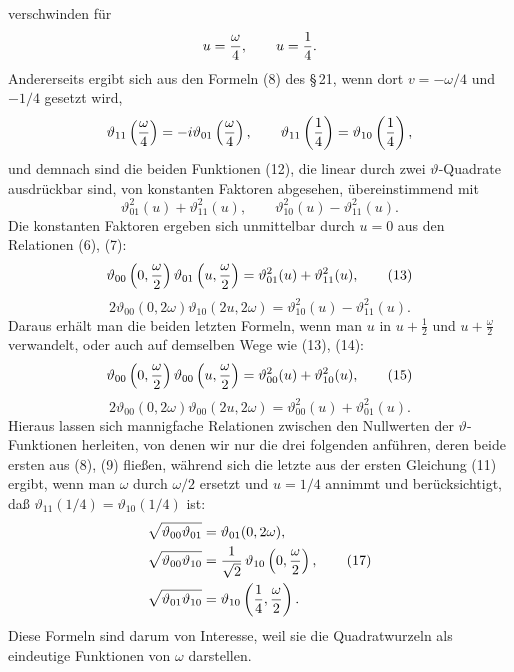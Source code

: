\documentclass[11pt]{article}
\providecommand{\tht}{\vartheta}
\begin{document}
verschwinden für
\[u={\omega\over4},\qquad u={1\over4}.
\]
Andererseits ergibt sich aus den Formeln (8) des \S\,21, wenn dort $v=-\omega/4$ und $-1/4$ gesetzt wird,
\[
\tht_{11}\left({\omega\over4}\right)=-i\tht_{01}\left({\omega\over4}\right),
\qquad
\tht_{11}\left({1\over4}\right)=\tht_{10}\left({1\over4}\right),
\]
und demnach sind die beiden Funktionen (12), die linear durch zwei $\vartheta$-Quadrate ausdrückbar sind, von konstanten Faktoren abgesehen, übereinstimmend mit
\[
\tht_{01}^2(u)+\tht_{11}^2(u),\qquad \tht_{10}^2(u)-\tht_{11}^2(u).
\]
Die konstanten Faktoren ergeben sich unmittelbar durch $u=0$ aus den Relationen (6), (7):
\begin{equation}
\tht_{00}\left(0,{\omega\over2}\right)\tht_{01}\left(u,{\omega\over2}\right)=\tht_{01}^2(u)+\tht_{11}^2(u), \tag{13}
\end{equation}
\begin{equation}
2\tht_{00}(0,2\omega)\tht_{10}(2u,2\omega)=\tht_{10}^2(u)-\tht_{11}^2(u). \tag{14}
\end{equation}
Daraus erhält man die beiden letzten Formeln, wenn man $u$ in $u+\frac12$ und $u+\frac{\omega}{2}$ verwandelt, oder auch auf demselben Wege wie (13), (14):
\begin{equation}
\tht_{00}\left(0,{\omega\over2}\right)\tht_{00}\left(u,{\omega\over2}\right)=\tht_{00}^2(u)+\tht_{10}^2(u), \tag{15}
\end{equation}
\begin{equation}
2\tht_{00}(0,2\omega)\tht_{00}(2u,2\omega)=\tht_{00}^2(u)+\tht_{01}^2(u). \tag{16}
\end{equation}
Hieraus lassen sich mannigfache Relationen zwischen den Nullwerten der $\vartheta$-Funktionen herleiten, von denen wir nur die drei folgenden anführen, deren beide ersten aus (8), (9) fließen, während sich die letzte aus der ersten Gleichung (11) ergibt, wenn man $\omega$ durch $\omega/2$ ersetzt und $u=1/4$ annimmt und berücksichtigt, daß $\tht_{11}(1/4)=\tht_{10}(1/4)$ ist:
\begin{align}
\sqrt{\tht_{00}\tht_{01}}&=\tht_{01}(0,2\omega),\notag\\
\sqrt{\tht_{00}\tht_{10}}&={1\over\sqrt2}\,\tht_{10}\left(0,{\omega\over2}\right), \tag{17}\\
\sqrt{\tht_{01}\tht_{10}}&=\tht_{10}\left({1\over4},{\omega\over2}\right).\notag
\end{align}
Diese Formeln sind darum von Interesse, weil sie die Quadratwurzeln als eindeutige Funktionen von $\omega$ darstellen.
\end{document}
